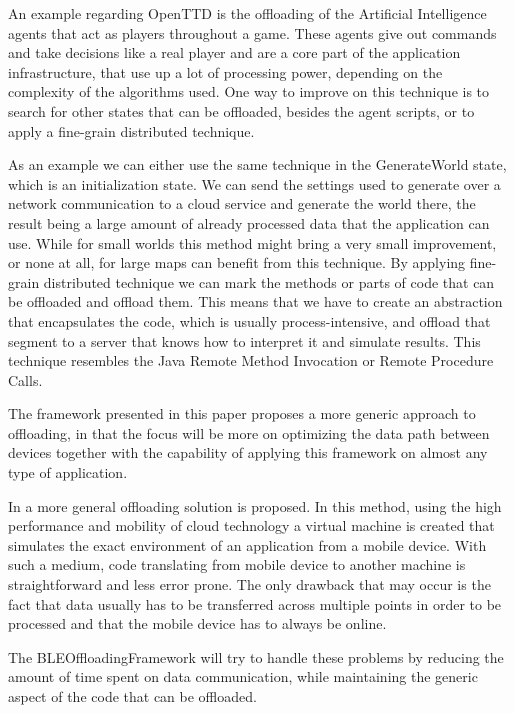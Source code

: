 An example regarding OpenTTD is the offloading of the Artificial Intelligence agents that act as players throughout a game. These agents give out commands and take decisions like a real player and are a core part of the application infrastructure, that use up a lot of processing power, depending on the complexity of the algorithms used. One way to improve on this technique is to search for other states that can be offloaded, besides the agent scripts, or to apply a fine-grain distributed technique. 

As an example we can either use the same technique in the GenerateWorld state, which is an initialization state. We can send the settings used to generate over a network communication to a cloud service and generate the world there, the result being a large amount of already processed data that the application can use. While for small worlds this method might bring a very small improvement, or none at all, for large maps can benefit from this technique. By applying fine-grain distributed technique we can mark the methods or parts of code that can be offloaded and offload them. This means that we have to create an abstraction that encapsulates the code, which is usually process-intensive, and offload that segment to a server that knows how to interpret it and simulate results. This technique resembles the Java Remote Method Invocation or Remote Procedure Calls.

The framework presented in this paper proposes a more generic approach to offloading, in that the focus will be more on optimizing the data path between devices together with the capability of applying this framework on almost any type of application.

In \cite{chun2011clonecloud} a more general offloading solution is proposed. In this method, using the high performance and mobility of cloud technology a virtual machine is created that simulates the exact environment of an application from a mobile device. With such a medium, code translating from mobile device to another machine is straightforward and less error prone. The only drawback that may occur is the fact that data usually has to be transferred across multiple points in order to be processed and that the mobile device has to always be online.

The BLEOffloadingFramework will try to handle these problems by reducing the amount of time spent on data communication, while maintaining the generic aspect of the code that can be offloaded.